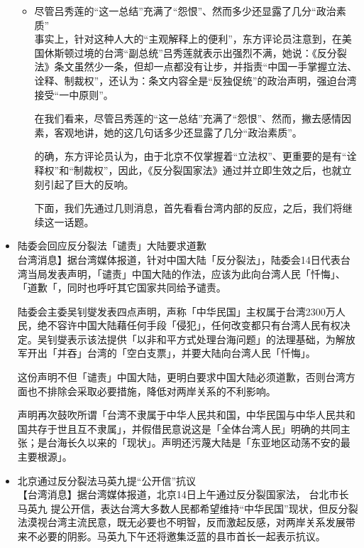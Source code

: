 \documentclass[a4paper,11pt]{article}
\begin{document}
\begin{itemize}
\begin{itemize}
\item 尽管吕秀莲的“这一总结”充满了“怨恨”、然而多少还显露了几分“政治素质”\\
\label{sec-2_1_9}%
事实上，针对这种人大的“主观解释上的便利”，东方评论员注意到，在美国休斯顿过境的台湾“副总统”吕秀莲就表示出强烈不满，她说：《反分裂法》条文虽然少一条，但却一点都没有让步，并指责“中国一手掌握立法、诠释、制裁权”，还认为：条文内容全是“反独促统”的政治声明，强迫台湾接受“一中原则”。

    在我们看来，尽管吕秀莲的“这一总结”充满了“怨恨”、然而，撇去感情因素，客观地讲，她的这几句话多少还显露了几分“政治素质”。

    的确，东方评论员认为，由于北京不仅掌握着“立法权”、更重要的是有“诠释权”和“制裁权”，因此，《反分裂国家法》通过并立即生效之后，也就立刻引起了巨大的反响。

    下面，我们先通过几则消息，首先看看台湾内部的反应，之后，我们将继续这一话题。

\end{itemize} %

\item 陆委会回应反分裂法「谴责」大陆要求道歉\\
\label{sec-2_2}%
台湾消息】据台湾媒体报道，针对中国大陆「反分裂法」，陆委会14日代表台湾当局发表声明，「谴责」中国大陆的作法，应该为此向台湾人民「忏悔」、「道歉「，同时也呼吁其它国家共同给予谴责。

   陆委会主委吴钊燮发表四点声明，声称「中华民国」主权属于台湾2300万人民，绝不容许中国大陆藉任何手段「侵犯」，任何改变都只有台湾人民有权决定。吴钊燮表示该法提供「以非和平方式处理台海问题」的法理基础，为解放军开出「并吞」台湾的「空白支票」，并要大陆向台湾人民「忏悔」。

   这份声明不但「谴责」中国大陆，更明白要求中国大陆必须道歉，否则台湾方面也不排除会采取必要措施，降低对两岸关系的不利影响。

   声明再次鼓吹所谓「台湾不隶属于中华人民共和国，中华民国与中华人民共和国共存于世且互不隶属」，并假借民意说这是「全体台湾人民」明确的共同主张；是台海长久以来的「现状」。声明还污蔑大陆是「东亚地区动荡不安的最主要根源」。


\item 北京通过反分裂法马英九提“公开信”抗议\\
\label{sec-2_3}%
【台湾消息】据台湾媒体报道，北京14日上午通过反分裂国家法，
   {台北市长马英九}
   提公开信，表达台湾大多数人民都希望维持“中华民国”现状，但反分裂法漠视台湾主流民意，既无必要也不明智，反而激起反感，对两岸关系发展带来不必要的阴影。马英九下午还将邀集泛蓝的县市首长一起表示抗议。


\end{itemize}
\end{document}
